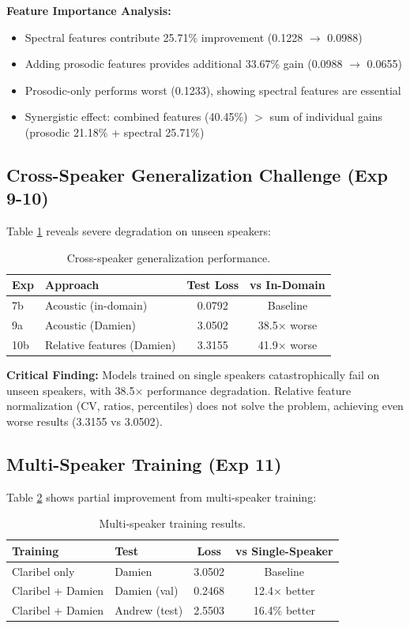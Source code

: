 \textbf{Feature Importance Analysis:}
\begin{itemize}
    \item Spectral features contribute 25.71\% improvement (0.1228 $\rightarrow$ 0.0988)
    \item Adding prosodic features provides additional 33.67\% gain (0.0988 $\rightarrow$ 0.0655)
    \item Prosodic-only performs worst (0.1233), showing spectral features are essential
    \item Synergistic effect: combined features (40.45\%) $>$ sum of individual gains (prosodic 21.18\% + spectral 25.71\%)
\end{itemize}

\subsection{Cross-Speaker Generalization Challenge (Exp 9-10)}

Table \ref{tab:cross_speaker} reveals severe degradation on unseen speakers:

\begin{table}[h]
\centering
\caption{Cross-speaker generalization performance.}
\label{tab:cross_speaker}
\begin{tabular}{llcc}
\toprule
\textbf{Exp} & \textbf{Approach} & \textbf{Test Loss} & \textbf{vs In-Domain} \\
\midrule
7b & Acoustic (in-domain) & 0.0792 & Baseline \\
9a & Acoustic (Damien) & 3.0502 & 38.5× worse \\
10b & Relative features (Damien) & 3.3155 & 41.9× worse \\
\bottomrule
\end{tabular}
\end{table}

\textbf{Critical Finding:} Models trained on single speakers catastrophically fail on unseen speakers, with 38.5× performance degradation. Relative feature normalization (CV, ratios, percentiles) does not solve the problem, achieving even worse results (3.3155 vs 3.0502).

\subsection{Multi-Speaker Training (Exp 11)}

Table \ref{tab:multispeaker} shows partial improvement from multi-speaker training:

\begin{table}[h]
\centering
\caption{Multi-speaker training results.}
\label{tab:multispeaker}
\begin{tabular}{llcc}
\toprule
\textbf{Training} & \textbf{Test} & \textbf{Loss} & \textbf{vs Single-Speaker} \\
\midrule
Claribel only & Damien & 3.0502 & Baseline \\
Claribel + Damien & Damien (val) & 0.2468 & 12.4× better \\
Claribel + Damien & Andrew (test) & 2.5503 & 16.4\% better \\
\bottomrule
\end{tabular}
\end{table}

